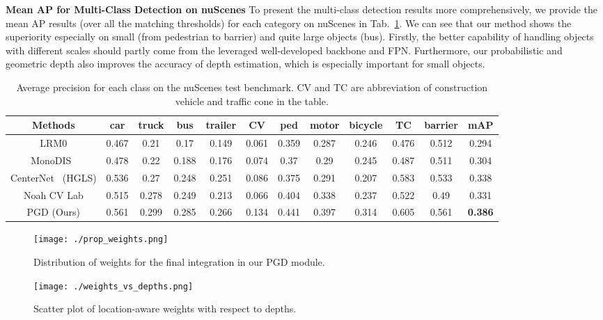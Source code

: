 \noindent\textbf{Mean AP for Multi-Class Detection on nuScenes}\quad
To present the multi-class detection results more comprehensively, we provide the mean AP results (over all the matching thresholds) for each category on nuScenes in Tab.~\ref{tab: ap_class}. We can see that our method shows the superiority especially on small (from pedestrian to barrier) and quite large objects (bus). Firstly, the better capability of handling objects with different scales should partly come from the leveraged well-developed backbone and FPN. Furthermore, our probabilistic and geometric depth also improves the accuracy of depth estimation, which is especially important for small objects.

\begin{table}\scriptsize
\caption{Average precision for each class on the nuScenes test benchmark. CV and TC are abbreviation of construction vehicle and traffic cone in the table.}
	\begin{center}
	\begin{tabular}{c|c|c|c|c|c|c|c|c|c|c|c}
	\hline
	Methods & car & truck & bus & trailer & CV & ped & motor & bicycle & TC & barrier & mAP\\
	\hline\hline
	LRM0 & 0.467 & 0.21 & 0.17 & 0.149 & 0.061 & 0.359 & 0.287 & 0.246 & 0.476 & 0.512 & 0.294\\
	\hline
	MonoDIS~\cite{MonoDIS} & 0.478 & 0.22 & 0.188 & 0.176 & 0.074 & 0.37 & 0.29 & 0.245 & 0.487 & 0.511 & 0.304\\
	\hline
	CenterNet~\cite{CenterNet} (HGLS) & 0.536 & 0.27 & 0.248 & 0.251 & 0.086 & 0.375 & 0.291 & 0.207 & 0.583 & 0.533 & 0.338\\
	\hline
	Noah CV Lab & 0.515 & 0.278 & 0.249 & 0.213 & 0.066 & 0.404 & 0.338 & 0.237 & 0.522 & 0.49 & 0.331\\
	\hline
	PGD (Ours) & 0.561 & 0.299 & 0.285 & 0.266 & 0.134 & 0.441 & 0.397 & 0.314 & 0.605 & 0.561 & \textbf{0.386}\\
	\hline
	\end{tabular}
	\end{center}
	\vspace{-5ex}
	\label{tab: ap_class}
\end{table}

\begin{figure}
\begin{minipage}{.48\linewidth}
    \centering
    \texttt{[image: ./prop\_weights.png]}
    \vspace{-5ex}
    \caption{Distribution of weights for the final integration in our PGD module.}
    \vspace{-2ex}
    \label{fig: prop_weights}
\end{minipage}
\hspace{1mm}
\begin{minipage}{.48\linewidth}
    \centering
    \texttt{[image: ./weights\_vs\_depths.png]}
    \vspace{-5ex}
    \caption{Scatter plot of location-aware weights with respect to depths.}
    \vspace{-2ex}
    \label{fig: weights_vs_depths}
\end{minipage}
\end{figure}

